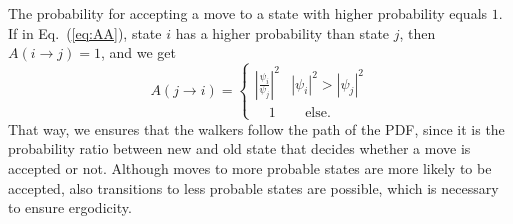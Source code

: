 The probability for accepting a move to a state with higher probability equals $1$. If in \mbox{Eq. (\ref{eq:AA})}, state $i$ has a higher probability than state $j$, then $A(i \rightarrow j)=1$, and we get
\begin{equation}
A(j \rightarrow i) = \begin{cases}
\left|\frac{\psi_i}{\psi_j}\right|^2 & |\psi_i|^2>|\psi_j|^2\\
\quad 1 & \quad\text{else}.
\end{cases}
\end{equation}
That way, we ensures that the walkers follow the path of the PDF, since it is the probability ratio between new and old state that decides whether a move is accepted or not. Although moves to more probable states are more likely to be accepted, also transitions to less probable states are possible, which is necessary to ensure ergodicity.

